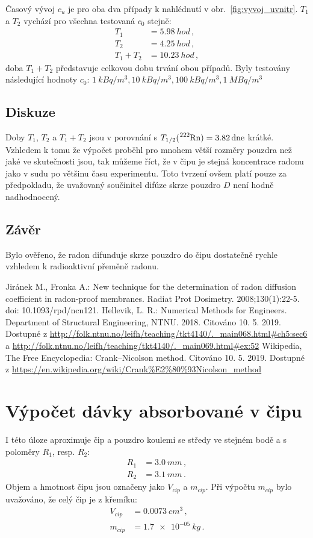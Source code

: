 \documentclass[11pt,a4paper]{article}
\begin{document}
Časový vývoj $c_u$ je pro oba dva případy k nahlédnutí v obr.~\ref{fig:vyvoj_uvnitr}. $T_1$ a $T_2$ vychází pro všechna testovaná $c_0$ stejně:
\begin{align}
	T_1&=\SI{5,98}{hod}\,,\\
	T_2&=\SI{4,25}{hod}\,,\\
	T_1+T_2&=\SI{10,23}{hod}\,,
\end{align}
doba $T_1+T_2$ představuje celkovou dobu trvání obou případů. Byly testovány následující hodnoty $c_0$: $\SI{1}{kBq/m^3}, \SI{10}{kBq/m^3}, \SI{100}{kBq/m^3}, \SI{1}{MBq/m^3}$
\subsection{Diskuze}
Doby $T_1$, $T_2$ a $T_1+T_2$ jsou v porovnání s $T_{1/2}(\ce{^{222}Rn})=\SI{3,82}{dne}$ krátké. Vzhledem k tomu že výpočet proběhl pro mnohem větší rozměry pouzdra než jaké ve skutečnosti jsou, tak můžeme říct, že v čipu je stejná koncentrace radonu jako v sudu po většinu času experimentu. Toto tvrzení ovšem platí pouze za předpokladu, že uvažovaný součinitel difúze skrze pouzdro $D$ není hodně nadhodnocený.
\subsection{Závěr}
Bylo ověřeno, že radon difunduje skrze pouzdro do čipu dostatečně rychle vzhledem k radioaktivní přeměně radonu.
\begin{thebibliography}{Mm99}
	 Jiránek M., Fronka A.: New technique for the determination of radon diffusion coefficient in radon-proof membranes. Radiat Prot Dosimetry. 2008;130(1):22-5. doi: 10.1093/rpd/ncn121.
	 Hellevik, L. R.: Numerical Methods for Engineers. Department of Structural Engineering, NTNU. 2018. Citováno 10. 5. 2019. Dostupné z \url{http://folk.ntnu.no/leifh/teaching/tkt4140/._main068.html#ch5:sec6} a \url{http://folk.ntnu.no/leifh/teaching/tkt4140/._main069.html#ex:52}
	 Wikipedia, The Free Encyclopedia: Crank–Nicolson method. Citováno 10. 5. 2019. Dostupné z \url{https://en.wikipedia.org/wiki/Crank%E2%80%93Nicolson_method}
	\end{thebibliography}
\section{Výpočet dávky absorbované v čipu}
I této úloze aproximuje čip a pouzdro koulemi se středy ve stejném bodě a s poloměry $R_1$, resp. $R_2$:
\begin{align}
	R_1&=\SI{3,0}{mm}\,,\\
	R_2&=\SI{3,1}{mm}\,.
\end{align}
Objem a hmotnost čipu jsou označeny jako $V_{cip}$ a $m_{cip}$. Při výpočtu $m_{cip}$ bylo uvažováno, že celý čip je z křemíku:
\begin{align}
	V_{cip}&=\SI{0,0073}{cm^3}\,,\\
	m_{cip}&=\SI{1.7e-05}{kg}\,.
\end{align}
\end{document}
